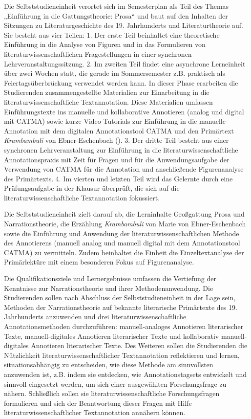 \documentclass[
          a4paper,
        ]{article}
\begin{document}
Die Selbststudieneinheit verortet sich im Semesterplan als Teil des
Themas „Einführung in die Gattungstheorie: Prosa`` und baut auf den
Inhalten der Sitzungen zu Literaturgeschichte des 19. Jahrhunderts und
Literaturtheorie auf. Sie besteht aus vier Teilen: 1. Der erste Teil
beinhaltet eine theoretische Einführung in die Analyse von Figuren und
in das Formulieren von literaturwissenschaftlichen Fragestellungen in
einer synchronen Lehrveranstaltungssitzung. 2. Im zweiten Teil findet
eine asynchrone Lerneinheit über zwei Wochen statt, die gerade im
Sommersemester z.B. praktisch als Feiertagsüberbrückung verwendet werden
kann. In dieser Phase erarbeiten die Studierenden zusammengestellte
Materialien zur Einarbeitung in die literaturwissenschaftliche
Textannotation. Diese Materialien umfassen Einführungstexte ins manuelle
und kollaborative Annotieren (analog und digital mit CATMA) sowie kurze
Video-Tutorials zur Einführung in die manuelle Annotation mit dem
digitalen Annotationstool CATMA und den Primärtext \emph{Krambambuli}
von Ebner-Eschenbach
(). 3. Der dritte
Teil besteht aus einer synchronen Lehrveranstaltung zur Einführung in
die literaturwissenschaftliche Annotationspraxis mit Zeit für Fragen und
für die Anwendungsaufgabe der Verwendung von CATMA für die Annotation
und anschließende Figurenanalyse des Primärtexts. 4. Im vierten und
letzten Teil wird das Gelernte durch eine Prüfungsaufgabe in der Klausur
überprüft, die sich auf die literaturwissenschaftliche Textannotation
fokussiert.

Die Selbststudieneinheit zielt darauf ab, die Lerninhalte Großgattung
Prosa und Narrationstheorie, die Erzählung \emph{Krambambuli} von Marie
von Ebner-Eschenbach sowie die Einführung und Anwendung der
literaturwissenschaftlichen Methode des Annotierens (manuell analog und
manuell digital mit dem Annotationstool CATMA) zu vermitteln. Zudem
beinhaltet die Einheit die Einzeltextanalyse der Primärlektüre mit einem
besonderen Fokus auf Figurenanalyse.

Die Qualifikationsziele und Lernergebnisse umfassen die Vertiefung der
Kenntnisse zur Narrationstheorie und ihrer Methodenanwendung. Die
Studierenden sollen nach Abschluss der Selbststudieneinheit in der Lage
sein, Methoden der Narrationstheorie auf bekannte literarische
Primärtexte des 19. Jahrhunderts anzuwenden und drei
literaturwissenschaftliche Annotationsmethoden durchzuführen:
manuell-analoges Annotieren literarischer Texte, manuell-digitales
Annotieren literarischer Texte und kollaborativ manuell-digitales
Annotieren literarischer Texte. Des Weiteren sollen die Studierenden die
Nützlichkeit literaturwissenschaftlicher Textannotation reflektieren und
lernen, situationsabhängig zu entscheiden, wie diese Methode am
sinnvollsten anzuwenden ist, z.B. indem sie entdecken, wie
Annotationstagsets entwickelt und sinnvoll eingesetzt werden, um sich
einer ausgewählten Forschungsfrage zu nähern. Schließlich sollen sie
literaturwissenschaftliche Forschungsfragen formulieren und sich der
Beantwortung dieser Fragen mit Hilfe literaturwissenschaftlicher
Textannotation annähern können.
\end{document}
